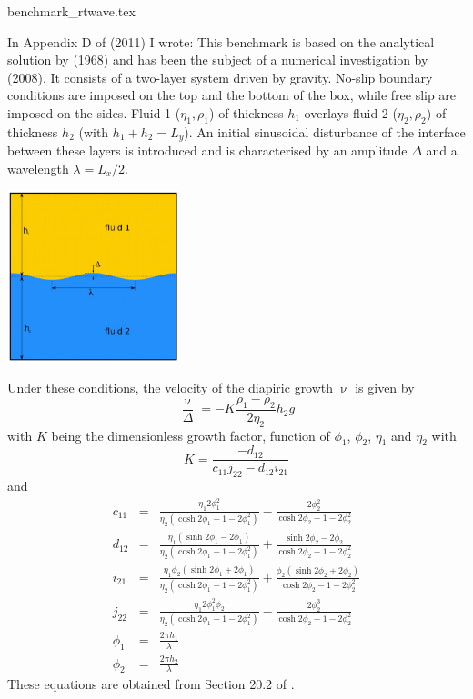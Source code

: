 \begin{flushright} {\tiny {\color{gray} benchmark\_rtwave.tex}} \end{flushright}

In Appendix D of \textcite{thie11} (2011) I wrote:
This benchmark is based on the analytical solution by \textcite{ramb68} (1968) 
and has been the subject of a numerical investigation by
\textcite{deka08} (2008). It consists of a two-layer system driven 
by gravity. No-slip boundary conditions are imposed on the
top and the bottom of the box, while free slip are imposed on
the sides. Fluid 1 ($\eta_1,\rho_1$) of thickness $h_1$ 
overlays ﬂuid 2 ($\eta_2,\rho_2$) of thickness $h_2$ 
(with $h_1+h_2=L_y$).
An initial sinusoidal disturbance of the interface between these
layers is introduced and is characterised by an amplitude $\Delta$ and a
wavelength $\lambda = L_x/2$.

\begin{center}
\includegraphics[width=5cm]{images/rtwave/setup}
\end{center}

Under these conditions, the velocity of the diapiric growth $\upnu$ is
given by
\[
\frac{\upnu}{\Delta} = -K \frac{\rho_1-\rho_2}{2 \eta_2} h_2 g
\]
with $K$ being the dimensionless growth factor, function of
$\phi_1$, $\phi_2$, $\eta_1$ and $\eta_2$ 
with 
\[
K=\frac{-d_{12}}{c_{11}j_{22}-d_{12}i_{21}}
\]
and 
\begin{eqnarray}
c_{11} &=& \frac{\eta_1 2 \phi_1^2}{\eta_2(\cosh 2\phi_1 - 1 - 2\phi_1^2)} - \frac{2\phi_2^2}{\cosh 2\phi_2 - 1 - 2 \phi_2^2}\\
d_{12} &=& \frac{\eta_1(\sinh 2\phi_1 -2\phi_1)}{\eta_2(\cosh 2\phi_1 -1 -2\phi_1^2)} + \frac{\sinh 2\phi_2 - 2\phi_2}{\cosh 2\phi_2 -1 -2\phi_2^2} \\
i_{21} &=& \frac{\eta_1\phi_2 (\sinh 2 \phi_1 + 2 \phi_1)}{\eta_2(\cosh 2\phi_1 -1 -2\phi_1^2)} 
+ \frac{\phi_2 (\sinh 2\phi_2 + 2\phi_2)}{\cosh 2\phi_2 -1 -2\phi_2^2} \\
j_{22} &=& \frac{\eta_1 2 \phi_1^2 \phi_2}{\eta_2(\cosh 2\phi_1 -1-2\phi_1^2)} - \frac{2\phi_2^3}{ \cosh 2\phi_2 -1 -2\phi_2^2}\\
\phi_1&=&\frac{2\pi h_1}{\lambda}\\
\phi_2&=&\frac{2\pi h_2}{\lambda}
\end{eqnarray}
These equations are obtained from Section 20.2 of \textcite{gery19book}.

